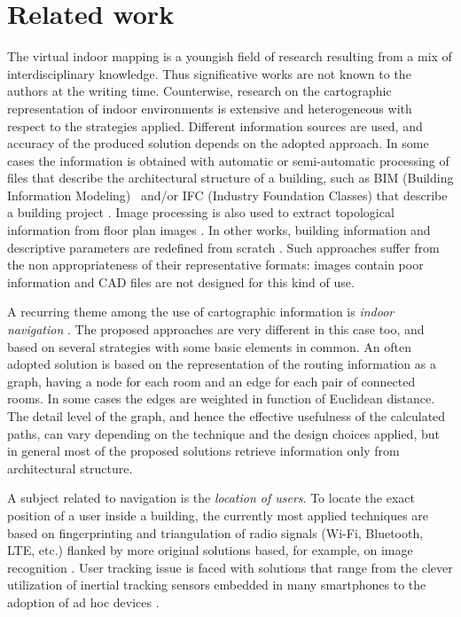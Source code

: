 \section{Related work}\label{related-work}

The virtual indoor mapping is a youngish field of research resulting from a mix of interdisciplinary knowledge. Thus significative works are not known to the authors at the writing time. Counterwise, research on the cartographic representation of indoor environments is
extensive and heterogeneous with respect to the strategies
applied. Different information sources are used, and accuracy of the
produced solution depends on the adopted approach. In some cases the
information is obtained with automatic or semi-automatic processing of files
that describe the architectural structure of a building, such as BIM (Building Information Modeling)~\cite{Eastman:2008:BHG:1796500} and/or IFC (Industry Foundation Classes) that describe a building project \cite{6816739}. Image processing is also used to
extract topological information from floor plan images \cite{6878152}. In
other works, building information and descriptive parameters are redefined
from scratch \cite{6418876}. Such approaches suffer from the non appropriateness of
their representative formats: images contain poor information and CAD
files are not designed for this kind of use. 

A recurring theme among the use
of cartographic information is \emph{indoor navigation}
\cite{6878152,6418876,6816739}. The proposed approaches are very different in
this case too, and based on several strategies with some basic elements in
common. An often adopted solution is based on the representation of the
routing information as a graph, having a node for each room and an edge for
each pair of connected rooms. In some cases the edges are weighted in
function of Euclidean distance. The detail level of the graph, and hence the
effective usefulness of the calculated paths, can vary depending on the
technique and the design choices applied, but in general most of the proposed
solutions retrieve information only from architectural structure. 

A subject related to navigation is the \emph{location of users}. To locate the exact position of a user inside a
building, the currently most applied techniques are based on fingerprinting and
triangulation of radio signals (Wi-Fi, Bluetooth, LTE, etc.) flanked by more
original solutions based, for example, on image recognition \cite{6815564}.
User tracking issue is faced with solutions that range from the clever
utilization of inertial tracking sensors embedded in many smartphones
\cite{6815564} to the adoption of ad hoc devices \cite{6878152}.

